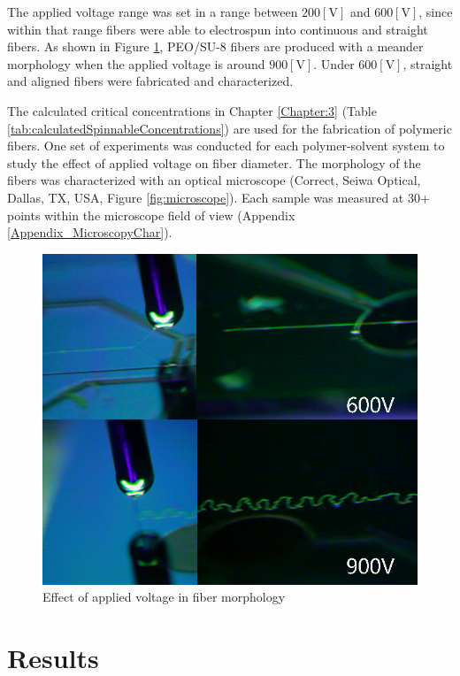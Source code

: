 The applied voltage range was set in a range between $200 [\textrm{V}]$ and $600 [\textrm{V}]$, since within that range fibers were able to electrospun into continuous and straight fibers. As shown in Figure \ref{fig:lowVoltageHighVoltage}, PEO/SU-8 fibers are produced with a meander morphology when the applied voltage is around $900 [\textrm{V}]$. Under $600 [\textrm{V}]$, straight and aligned fibers were fabricated and characterized.

The calculated critical concentrations in Chapter \ref{Chapter:3} (Table \ref{tab:calculatedSpinnableConcentrations}) are used for the fabrication of polymeric fibers. One set of experiments was conducted for each polymer-solvent system to study the effect of applied voltage on fiber diameter. The morphology of the fibers was characterized with an optical microscope (Correct, Seiwa Optical, Dallas, TX, USA, Figure \ref{fig:microscope}). Each sample was measured at 30+ points within the microscope field of view (Appendix \ref{Appendix_MicroscopyChar}).

\begin{figure}[!th]
\centering
\includegraphics[scale=0.40]{./Figures/lowVoltageHighVoltage.png}
\decoRule
\caption{Effect of applied voltage in fiber morphology}
\label{fig:lowVoltageHighVoltage}
\end{figure}

\section{Results}


